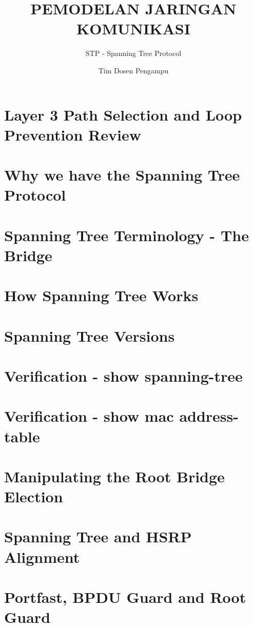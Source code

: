 \documentclass[pdflatex,compress,mathserif]{beamer}
\title{PEMODELAN JARINGAN KOMUNIKASI}
\subtitle{STP - Spanning Tree Protocol}
\author{Tim Dosen Pengampu}
\begin{document}
	
\maketitle

\section{Layer 3 Path Selection and Loop Prevention Review}

\section{Why we have the Spanning Tree Protocol}

\section{Spanning Tree Terminology - The Bridge}

\section{How Spanning Tree Works}

\section{Spanning Tree Versions}

\section{Verification - show spanning-tree}

\section{Verification - show mac address-table}

\section{Manipulating the Root Bridge Election}

\section{Spanning Tree and HSRP Alignment}

\section{Portfast, BPDU Guard and Root Guard}
\end{document}
